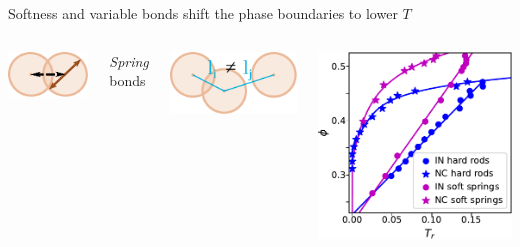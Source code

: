 \documentclass[aspectratio=169]{beamer}
\begin{document}
\begin{frame}[c]{Softness and variable bonds shift the phase boundaries to lower $T$}
\begin{columns}[T]
\begin{columns}[T]
      \includegraphics[scale=0.65]{../figures/fig-all_potentials/fig-pairs/fig-pair_soft.pdf}


      \centering
      \textcolor{FigOrange}{\Large \emph{Spring} bonds}
      \vspace{0.5\baselineskip}

      \includegraphics[scale=0.65]{../figures/fig-all_potentials/fig-bonds/fig-bond_spring.pdf}

    \end{columns}

    \centering
    \vspace{0.5\baselineskip}

    \includegraphics[]{../figures/fig-soft_vs_hard_phase_diag/fig-phase_diag.pdf}

  \end{columns}
\end{frame}
\end{document}
